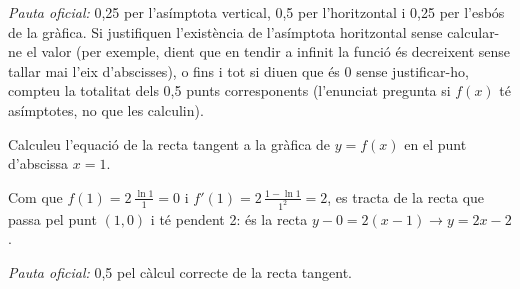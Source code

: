 \begin{apartats}
\begin{solucio}
\textit{Pauta oficial:} 0,25 per l'asímptota vertical, 0,5 per l'horitzontal i 0,25 per l'esbós de la gràfica.
Si justifiquen l'existència de l'asímptota horitzontal sense calcular-ne el valor (per exemple, dient que en
tendir a infinit la funció és decreixent sense tallar mai l'eix d'abscisses), o fins i tot si diuen que és 0
sense justificar-ho, compteu la totalitat dels 0,5 punts corresponents (l'enunciat pregunta si $f(x)$ té
asímptotes, no que les calculin).
\end{solucio}

Calculeu l'equació de la recta tangent a la gràfica de $y=f(x)$ en el punt d'abscissa $x=1$.

\begin{solucio}
Com que $f(1)=2\,\frac{\ln1}{1}=0$ i $f'(1)=2\,\frac{1-\ln1}{1^2}=2$, es tracta de la recta que passa pel
punt $(1,0)$ i té pendent 2: és la recta $y-0=2(x-1)\rightarrow y=2x-2$.

\textit{Pauta oficial:} 0,5 pel càlcul correcte de la recta tangent.
\end{solucio}

\end{apartats}
